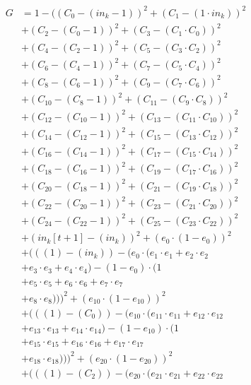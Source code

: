 \documentclass[10pt, a4paper]{article}
\begin{document}
\begin{small}
\begin{align*}
G &= 1 - ((C_{0} - (in_k - 1))^{2} + (C_{1} - (1  \cdot  in_k))^{2} \\
& + (C_{2} - (C_{0} - 1))^{2} + (C_{3} - (C_{1}  \cdot  C_{0}))^{2} \\
& + (C_{4} - (C_{2} - 1))^{2} + (C_{5} - (C_{3}  \cdot  C_{2}))^{2} \\
& + (C_{6} - (C_{4} - 1))^{2} + (C_{7} - (C_{5}  \cdot  C_{4}))^{2} \\
& + (C_{8} - (C_{6} - 1))^{2} + (C_{9} - (C_{7}  \cdot  C_{6}))^{2} \\
& + (C_{10} - (C_{8} - 1))^{2} + (C_{11} - (C_{9}  \cdot  C_{8}))^{2} \\
& + (C_{12} - (C_{10} - 1))^{2} + (C_{13} - (C_{11}  \cdot  C_{10}))^{2} \\
& + (C_{14} - (C_{12} - 1))^{2} + (C_{15} - (C_{13}  \cdot  C_{12}))^{2} \\
& + (C_{16} - (C_{14} - 1))^{2} + (C_{17} - (C_{15}  \cdot  C_{14}))^{2} \\
& + (C_{18} - (C_{16} - 1))^{2} + (C_{19} - (C_{17}  \cdot  C_{16}))^{2} \\
& + (C_{20} - (C_{18} - 1))^{2} + (C_{21} - (C_{19}  \cdot  C_{18}))^{2} \\
& + (C_{22} - (C_{20} - 1))^{2} + (C_{23} - (C_{21}  \cdot  C_{20}))^{2} \\
& + (C_{24} - (C_{22} - 1))^{2} + (C_{25} - (C_{23}  \cdot  C_{22}))^{2} \\
& + (in_k[t+1] - (in_k))^{2} + (e_{0} \cdot (1 - e_{0}))^{2} \\
& + (((1) - (in_k)) - (e_{0} \cdot (e_{1} \cdot e_{1} + e_{2} \cdot e_{2} \\
& + e_{3} \cdot e_{3} + e_{4} \cdot e_{4}) - (1 - e_{0}) \cdot (1 \\
& + e_{5} \cdot e_{5} + e_{6} \cdot e_{6} + e_{7} \cdot e_{7} \\
& + e_{8} \cdot e_{8})))^{2} + (e_{10} \cdot (1 - e_{10}))^{2} \\
& + (((1) - (C_{0})) - (e_{10} \cdot (e_{11} \cdot e_{11} + e_{12} \cdot e_{12} \\
& + e_{13} \cdot e_{13} + e_{14} \cdot e_{14}) - (1 - e_{10}) \cdot (1 \\
& + e_{15} \cdot e_{15} + e_{16} \cdot e_{16} + e_{17} \cdot e_{17} \\
& + e_{18} \cdot e_{18})))^{2} + (e_{20} \cdot (1 - e_{20}))^{2} \\
& + (((1) - (C_{2})) - (e_{20} \cdot (e_{21} \cdot e_{21} + e_{22} \cdot e_{22} \\

\end{align*}
\end{small}
\end{document}
